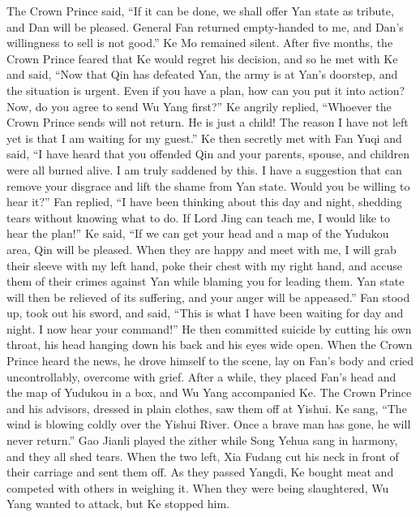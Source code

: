 \documentclass[12pt]{book}
\begin{document}
\begin{pairs}
\begin{Leftside}
\begin{fioesjfsoeifj}
The Crown Prince said, ``If it can be done, we shall offer Yan state as tribute, and Dan will be pleased. General Fan returned empty-handed to me, and Dan's willingness to sell is not good.'' Ke Mo remained silent. After five months, the Crown Prince feared that Ke would regret his decision, and so he met with Ke and said, ``Now that Qin has defeated Yan, the army is at Yan's doorstep, and the situation is urgent. Even if you have a plan, how can you put it into action? Now, do you agree to send Wu Yang first?'' Ke angrily replied, ``Whoever the Crown Prince sends will not return. He is just a child! The reason I have not left yet is that I am waiting for my guest.'' Ke then secretly met with Fan Yuqi and said, ``I have heard that you offended Qin and your parents, spouse, and children were all burned alive. I am truly saddened by this. I have a suggestion that can remove your disgrace and lift the shame from Yan state. Would you be willing to hear it?'' Fan replied, ``I have been thinking about this day and night, shedding tears without knowing what to do. If Lord Jing can teach me, I would like to hear the plan!'' Ke said, ``If we can get your head and a map of the Yudukou area, Qin will be pleased. When they are happy and meet with me, I will grab their sleeve with my left hand, poke their chest with my right hand, and accuse them of their crimes against Yan while blaming you for leading them. Yan state will then be relieved of its suffering, and your anger will be appeased.'' Fan stood up, took out his sword, and said, ``This is what I have been waiting for day and night. I now hear your command!'' He then committed suicide by cutting his own throat, his head hanging down his back and his eyes wide open. When the Crown Prince heard the news, he drove himself to the scene, lay on Fan's body and cried uncontrollably, overcome with grief. After a while, they placed Fan's head and the map of Yudukou in a box, and Wu Yang accompanied Ke. The Crown Prince and his advisors, dressed in plain clothes, saw them off at Yishui. Ke sang, ``The wind is blowing coldly over the Yishui River. Once a brave man has gone, he will never return.'' Gao Jianli played the zither while Song Yehua sang in harmony, and they all shed tears. When the two left, Xia Fudang cut his neck in front of their carriage and sent them off. As they passed Yangdi, Ke bought meat and competed with others in weighing it. When they were being slaughtered, Wu Yang wanted to attack, but Ke stopped him.
\pend
\endnumbering
\end{fioesjfsoeifj}
\end{Leftside}
\end{pairs}
\end{document}
